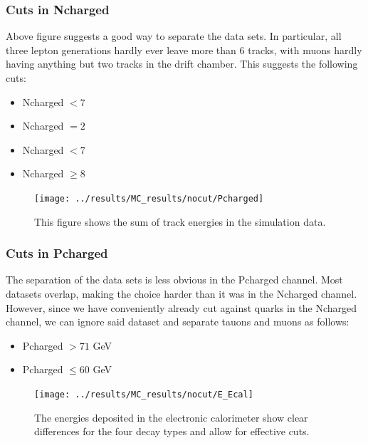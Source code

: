 \subsubsection{Cuts in Ncharged}
Above figure suggests a good way to separate the data sets. In particular, all three lepton generations hardly ever leave more than 6 tracks, with muons hardly having anything but two tracks in the drift chamber. This suggests the following cuts:

\begin{itemize}
	\item{ Ncharged $<7$}
	\item{ Ncharged $=2$}
	\item{ Ncharged $<7$}
	\item{ Ncharged $\ge8$}
\end{itemize}



\newpage
\begin{figure}[H]
\centering
\texttt{[image: ../results/MC\_results/nocut/Pcharged]}
\caption[Pcharged in simulation data]{This figure shows the sum of track energies in the simulation data. }
\label{fig:Pcharged}
\end{figure}

\subsubsection{Cuts in Pcharged}
The separation of the data sets is less obvious in the Pcharged channel. Most datasets overlap, making the choice harder than it was in the Ncharged channel. However, since we have conveniently already cut against quarks in the Ncharged channel, we can ignore said dataset and separate tauons and muons as follows:
\begin{itemize}
	\item{ Pcharged $>71$ GeV}
	\item{ Pcharged $\le60$ GeV}
\end{itemize}

\newpage
\begin{figure}[H]
\centering
\texttt{[image: ../results/MC\_results/nocut/E\_Ecal]}
\caption[E\_Ecal in simulations]{The energies deposited in the electronic calorimeter show clear differences for the four decay types and allow for effective cuts.}
\label{fig:E_Ecal}
\end{figure}

